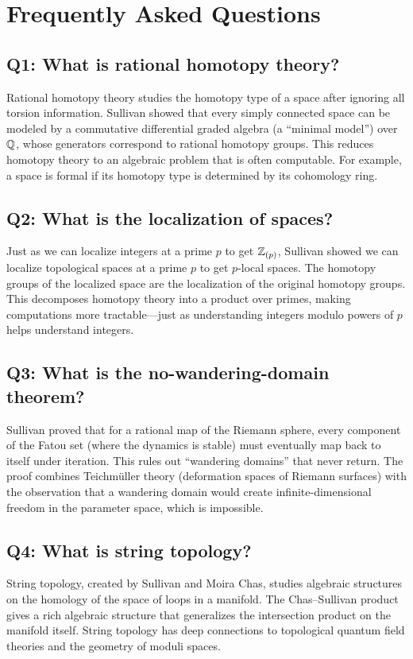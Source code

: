\section{Frequently Asked Questions}

\subsection*{Q1: What is rational homotopy theory?}
Rational homotopy theory studies the homotopy type of a space after ignoring all torsion information. Sullivan showed that every simply connected space can be modeled by a commutative differential graded algebra (a ``minimal model'') over $\mathbb{Q}$, whose generators correspond to rational homotopy groups. This reduces homotopy theory to an algebraic problem that is often computable. For example, a space is formal if its homotopy type is determined by its cohomology ring.

\subsection*{Q2: What is the localization of spaces?}
Just as we can localize integers at a prime $p$ to get $\mathbb{Z}_{(p)}$, Sullivan showed we can localize topological spaces at a prime $p$ to get $p$-local spaces. The homotopy groups of the localized space are the localization of the original homotopy groups. This decomposes homotopy theory into a product over primes, making computations more tractable---just as understanding integers modulo powers of $p$ helps understand integers.

\subsection*{Q3: What is the no-wandering-domain theorem?}
Sullivan proved that for a rational map of the Riemann sphere, every component of the Fatou set (where the dynamics is stable) must eventually map back to itself under iteration. This rules out ``wandering domains'' that never return. The proof combines Teichm\"uller theory (deformation spaces of Riemann surfaces) with the observation that a wandering domain would create infinite-dimensional freedom in the parameter space, which is impossible.

\subsection*{Q4: What is string topology?}
String topology, created by Sullivan and Moira Chas, studies algebraic structures on the homology of the space of loops in a manifold. The Chas--Sullivan product gives a rich algebraic structure that generalizes the intersection product on the manifold itself. String topology has deep connections to topological quantum field theories and the geometry of moduli spaces.


